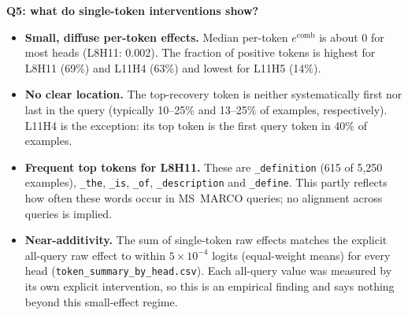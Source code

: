 \documentclass[11pt]{article}
\newcommand{\comb}{\ensuremath{e^{\mathrm{comb}}}}
\begin{document}
\textbf{Q5: what do single-token interventions show?}
\begin{itemize}[nosep]
\item \textbf{Small, diffuse per-token effects.} Median per-token \comb{} is
  about 0 for most heads (L8H11: 0.002). The fraction of positive tokens is
  highest for L8H11 (69\%) and L11H4 (63\%) and lowest for L11H5 (14\%).
\item \textbf{No clear location.} The top-recovery token is neither
  systematically first nor last in the query (typically 10--25\% and
  13--25\% of examples, respectively). L11H4 is the exception: its top token
  is the first query token in 40\% of examples.
\item \textbf{Frequent top tokens for L8H11.} These are
  \texttt{\_definition} (615 of 5{,}250 examples), \texttt{\_the},
  \texttt{\_is}, \texttt{\_of}, \texttt{\_description} and
  \texttt{\_define}. This partly reflects how often these words occur in
  MS~MARCO queries; no alignment across queries is implied.
\item \textbf{Near-additivity.} The sum of single-token raw effects matches
  the explicit all-query raw effect to within $5\times10^{-4}$ logits (equal-weight means) for
  every head (\texttt{token\_summary\_by\_head.csv}). Each all-query value
  was measured by its own explicit intervention, so this is an empirical
  finding and says nothing beyond this small-effect regime.
\end{itemize}
\end{document}
